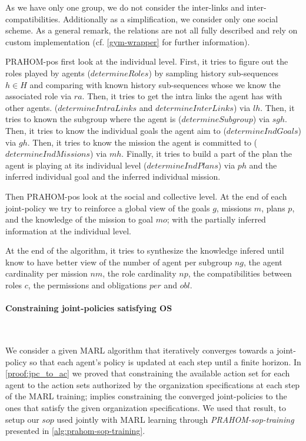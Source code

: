 \documentclass[runningheads]{llncs}
\newcounter{relation}
\newcounter{proof}
\begin{document}
As we have only one group, we do not consider the inter-links and inter-compatibilities. Additionally as a simplification, we consider only one social scheme. As a general remark, the  relations are not all fully described and rely on custom implementation (cf. \autoref{gym-wrapper} for further information).

PRAHOM-pos first look at the individual level.
First, it tries to figure out the roles played by agents ($determineRoles$) by sampling history sub-sequences $h \in H$ and comparing with known history sub-sequences whose we know the associated role via $ra$.
Then, it tries to get the intra links the agent has with other agents. ($determineIntraLinks$ and $determineInterLinks$) via $lh$.
Then, it tries to known the subgroup where the agent is ($determineSubgroup$) via $sgh$.
Then, it tries to know the individual goals the agent aim to ($determineIndGoals$) via $gh$.
Then, it tries to know the mission the agent is committed to ($determineIndMissions$) via $mh$.
Finally, it tries to build a part of the plan the agent is playing at its individual level ($determineIndPlans$) via $ph$ and the inferred individual goal and the inferred individual mission.

Then PRAHOM-pos look at the social and collective level.
At the end of each joint-policy we try to reinforce a global view of the goals $g$, missions $m$, plans $p$, and the knowledge of the mission to goal $mo$; with the partially inferred information at the individual level.

At the end of the algorithm, it tries to synthesize the knowledge infered until know to have better view of the number of agent per subgroup $ng$, the agent cardinality per mission $nm$, the role cardinality $np$, the compatibilities between roles $c$, the permissions and obligations $per$ and $obl$.


\paragraph{\textbf{Constraining joint-policies satisfying OS}}

\

We consider a given MARL algorithm that iteratively converges towards a joint-policy so that each agent's policy is updated at each step until a finite horizon. In \autoref{proof:jpc_to_ac} we proved that constraining the available action set for each agent to the action sets authorized by the organization specifications at each step of the MARL training; implies constraining the converged joint-policies to the ones that satisfy the given organization specifications. We used that result, to setup our $sop$ used jointly with MARL learning through \emph{PRAHOM-sop-training} presented in \autoref{alg:prahom-sop-training}.
\end{document}
